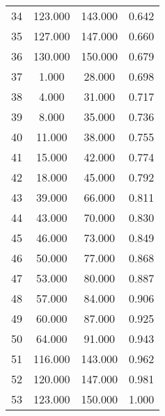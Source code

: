 \begin{tabular}{cccc}
  34 & 123.000 & 143.000 & 0.642 \\ 
  35 & 127.000 & 147.000 & 0.660 \\ 
  36 & 130.000 & 150.000 & 0.679 \\ 
  37 & 1.000 & 28.000 & 0.698 \\ 
  38 & 4.000 & 31.000 & 0.717 \\ 
  39 & 8.000 & 35.000 & 0.736 \\ 
  40 & 11.000 & 38.000 & 0.755 \\ 
  41 & 15.000 & 42.000 & 0.774 \\ 
  42 & 18.000 & 45.000 & 0.792 \\ 
  43 & 39.000 & 66.000 & 0.811 \\ 
  44 & 43.000 & 70.000 & 0.830 \\ 
  45 & 46.000 & 73.000 & 0.849 \\ 
  46 & 50.000 & 77.000 & 0.868 \\ 
  47 & 53.000 & 80.000 & 0.887 \\ 
  48 & 57.000 & 84.000 & 0.906 \\ 
  49 & 60.000 & 87.000 & 0.925 \\ 
  50 & 64.000 & 91.000 & 0.943 \\ 
  51 & 116.000 & 143.000 & 0.962 \\ 
  52 & 120.000 & 147.000 & 0.981 \\ 
  53 & 123.000 & 150.000 & 1.000 \\ 
   \hline
\end{tabular}
